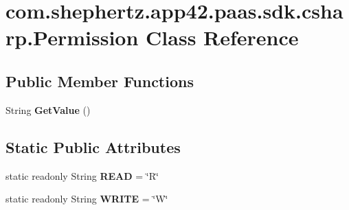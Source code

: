 \hypertarget{classcom_1_1shephertz_1_1app42_1_1paas_1_1sdk_1_1csharp_1_1_permission}{\section{com.\+shephertz.\+app42.\+paas.\+sdk.\+csharp.\+Permission Class Reference}
\label{classcom_1_1shephertz_1_1app42_1_1paas_1_1sdk_1_1csharp_1_1_permission}
}
\subsection*{Public Member Functions}
\begin{DoxyCompactItemize}
\item 
\hypertarget{classcom_1_1shephertz_1_1app42_1_1paas_1_1sdk_1_1csharp_1_1_permission_a93197798226109b09007f36e545e8417}{String {\bfseries Get\+Value} ()}\label{classcom_1_1shephertz_1_1app42_1_1paas_1_1sdk_1_1csharp_1_1_permission_a93197798226109b09007f36e545e8417}

\end{DoxyCompactItemize}
\subsection*{Static Public Attributes}
\begin{DoxyCompactItemize}
\item 
\hypertarget{classcom_1_1shephertz_1_1app42_1_1paas_1_1sdk_1_1csharp_1_1_permission_a6dbda355b2170b7414f272a911326920}{static readonly String {\bfseries R\+E\+A\+D} = \char`\"{}R\char`\"{}}\label{classcom_1_1shephertz_1_1app42_1_1paas_1_1sdk_1_1csharp_1_1_permission_a6dbda355b2170b7414f272a911326920}

\item 
\hypertarget{classcom_1_1shephertz_1_1app42_1_1paas_1_1sdk_1_1csharp_1_1_permission_a3bab9f6bd2bf5bd2ae808d0309c5fc12}{static readonly String {\bfseries W\+R\+I\+T\+E} = \char`\"{}W\char`\"{}}\label{classcom_1_1shephertz_1_1app42_1_1paas_1_1sdk_1_1csharp_1_1_permission_a3bab9f6bd2bf5bd2ae808d0309c5fc12}

\end{DoxyCompactItemize}
